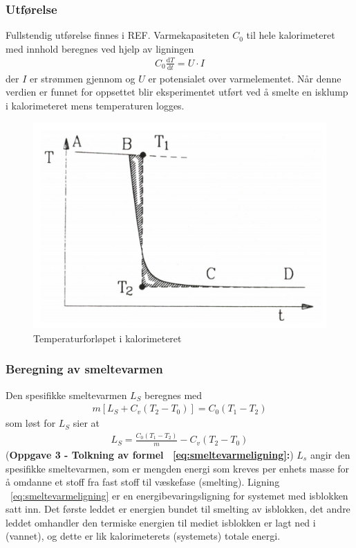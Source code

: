 \documentclass[aps,reprint]{revtex4-1}
\begin{document}
\subsubsection{Utførelse}
\noindent
Fullstendig utførelse finnes i REF. Varmekapasiteten $C_0$ til hele kalorimeteret
med innhold beregnes ved hjelp av ligningen
\begin{align}
  \label{eq:varmekapasitet}
  C_0 \frac{\text{d} T}{\text{d} t} = U \cdot I
\end{align}
der $I$ er strømmen gjennom og $U$ er potensialet over varmelementet. Når denne
verdien er funnet for oppsettet blir eksperimentet utført ved å smelte en isklump
i kalorimeteret mens temperaturen logges.
\begin{figure}[H]
  \centering
  \includegraphics[width=\linewidth]{tempforlop.png}
  \caption{Temperaturforløpet i kalorimeteret}
  \label{fig:tempforlop}
\end{figure}
\subsubsection{Beregning av smeltevarmen}
\noindent
Den spesifikke smeltevarmen $L_S$ beregnes med
\begin{align*}
  m[L_S + C_v (T_2 - T_0)] = C_0 (T_1 - T_2)
\end{align*}
som løst for $L_S$ sier at
\begin{align}
  \label{eq:smeltevarmeligning}
  L_S = \frac{C_0 (T_1 - T_2)}{m} - C_v (T_2 - T_0)
\end{align}
\noindent
(\textbf{Oppgave 3 - Tolkning av formel ~\ref{eq:smeltevarmeligning}:})
$L_s$ angir den spesifikke smeltevarmen, som er mengden energi som kreves
per enhets masse for å omdanne et stoff fra fast stoff til væskefase (smelting).
Ligning ~\ref{eq:smeltevarmeligning} er en energibevaringsligning for
systemet med isblokken satt inn. Det første leddet er energien bundet til
smelting av isblokken, det andre leddet omhandler den termiske energien til
mediet isblokken er lagt ned i (vannet), og dette er lik kalorimeterets
(systemets) totale energi.
\end{document}
